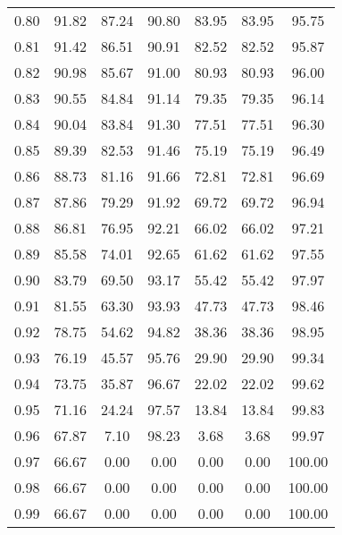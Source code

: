\begin{tabular}{|c|c|c|c|c|c|c|}
      0.80 &     91.82 &     87.24 &      90.80 &   83.95 &      83.95 &         95.75 \\
      0.81 &     91.42 &     86.51 &      90.91 &   82.52 &      82.52 &         95.87 \\
      0.82 &     90.98 &     85.67 &      91.00 &   80.93 &      80.93 &         96.00 \\
      0.83 &     90.55 &     84.84 &      91.14 &   79.35 &      79.35 &         96.14 \\
      0.84 &     90.04 &     83.84 &      91.30 &   77.51 &      77.51 &         96.30 \\
      0.85 &     89.39 &     82.53 &      91.46 &   75.19 &      75.19 &         96.49 \\
      0.86 &     88.73 &     81.16 &      91.66 &   72.81 &      72.81 &         96.69 \\
      0.87 &     87.86 &     79.29 &      91.92 &   69.72 &      69.72 &         96.94 \\
      0.88 &     86.81 &     76.95 &      92.21 &   66.02 &      66.02 &         97.21 \\
      0.89 &     85.58 &     74.01 &      92.65 &   61.62 &      61.62 &         97.55 \\
      0.90 &     83.79 &     69.50 &      93.17 &   55.42 &      55.42 &         97.97 \\
      0.91 &     81.55 &     63.30 &      93.93 &   47.73 &      47.73 &         98.46 \\
      0.92 &     78.75 &     54.62 &      94.82 &   38.36 &      38.36 &         98.95 \\
      0.93 &     76.19 &     45.57 &      95.76 &   29.90 &      29.90 &         99.34 \\
      0.94 &     73.75 &     35.87 &      96.67 &   22.02 &      22.02 &         99.62 \\
      0.95 &     71.16 &     24.24 &      97.57 &   13.84 &      13.84 &         99.83 \\
      0.96 &     67.87 &      7.10 &      98.23 &    3.68 &       3.68 &         99.97 \\
      0.97 &     66.67 &      0.00 &       0.00 &    0.00 &       0.00 &        100.00 \\
      0.98 &     66.67 &      0.00 &       0.00 &    0.00 &       0.00 &        100.00 \\
      0.99 &     66.67 &      0.00 &       0.00 &    0.00 &       0.00 &        100.00 \\
\bottomrule
\end{tabular}
